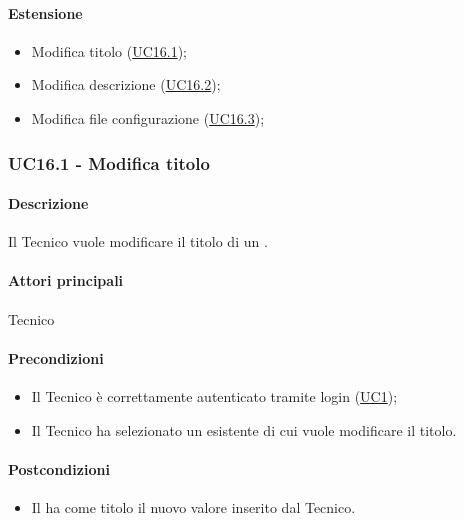 \paragraph*{Estensione}
\begin{itemize}
  \item Modifica titolo  (\hyperref[UC16point1]{UC16.1}); %
  \item Modifica descrizione  (\hyperref[UC16point2]{UC16.2}); %
  \item Modifica file configurazione  (\hyperref[UC16point3]{UC16.3}); %
\end{itemize}


\subsubsection{UC16.1 - Modifica titolo }\label{UC16point1}
\paragraph*{Descrizione}
Il Tecnico vuole modificare il titolo di un .

\paragraph*{Attori principali}
Tecnico

\paragraph*{Precondizioni}
\begin{itemize}
  \item Il Tecnico è correttamente autenticato tramite login (\hyperref[UC1]{UC1});
  \item Il Tecnico ha selezionato un  esistente di cui vuole modificare il titolo.
\end{itemize}

\paragraph*{Postcondizioni}
\begin{itemize}
  \item Il  ha come titolo il nuovo valore inserito dal Tecnico.
\end{itemize}

